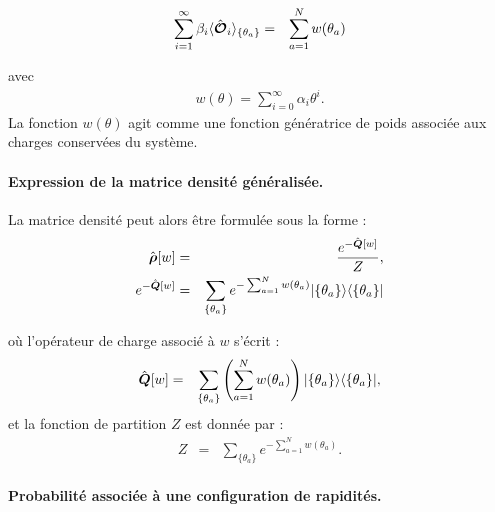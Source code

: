 \begin{eqnarray}
	\sum_{i = 1}^\infty  \beta_i \langle \hat{\bm{\mathcal{O}}}_i \rangle_{ \{\theta_a \} } & = & \sum_{a = 1 }^N  w(\theta_a) 
\end{eqnarray}
	
avec 
\begin{eqnarray}
	w(\theta) = \sum_{i=0}^\infty \alpha_i \theta^i.	
\end{eqnarray}
La fonction $w(\theta)$ agit comme une fonction génératrice de poids associée aux charges conservées du système.

\paragraph{Expression de la matrice densité généralisée.}
La matrice densité peut alors être formulée sous la forme :	
\begin{eqnarray}
	\hat{\bm{\rho}}[w] & = & \frac{e^{-\hat{\bm{Q}}[w]}}{Z}, \\
	e^{-\hat{\bm{Q}}[w]} & = & 	\sum_{\{\theta_a \}} e^{- \sum_{a = 1}^N w(\theta_a) } \vert \{ \theta_a\} \rangle \langle  \{ \theta_a\}  \vert 
\end{eqnarray}
 
	
où l'opérateur de charge associé à $w$ s’écrit :
\begin{eqnarray}
	\hat{\bm{Q}} [w]   & = &  \sum_{\{\theta_a \}} \left ( \sum_{a = 1}^N w ( \theta_a )  \right ) \vert \{ \theta_a \} \rangle \langle \{ \theta_a \} \vert,	
\end{eqnarray}
et la fonction de partition $Z$ est donnée par :
\begin{eqnarray}
	Z  & = & \sum_{\{\theta_a \}} e^{-\sum_{a = 1}^N w(\theta_a)}.		
\end{eqnarray}

\paragraph{Probabilité associée à une configuration de rapidités.}

